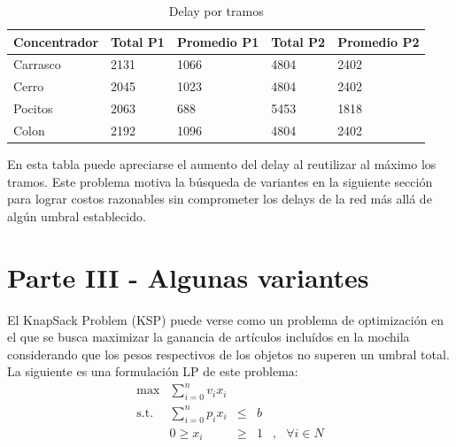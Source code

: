 \documentclass{extarticle}
\begin{document}
\begin{table}[h!]
	\centering
	\caption{Delay por tramos}
	\label{table:delay-tramos}
	\begin{tabular}{|l|l|l|l|l|} \hline
		Concentrador  &   Total P1    & Promedio P1 & Total P2    & Promedio P2   \\
		\hline
		Carrasco        &  2131 & 1066 & 4804 & 2402  \\  
		\hline
		Cerro     &  2045 & 1023 & 4804 & 2402  \\
		\hline
		Pocitos  &  2063 & 688 &  5453 & 1818 \\
		\hline
		Colon    &  2192 & 1096 &  4804 & 2402   \\
		\hline
	\end{tabular}
\end{table}
En esta tabla puede apreciarse el aumento del delay al reutilizar al máximo los tramos. Este problema motiva la búsqueda de variantes en la siguiente sección para lograr costos razonables sin comprometer los delays de la red más allá de algún umbral establecido.

\newpage
\section{Parte III - Algunas variantes}
El KnapSack Problem (KSP) puede verse como un problema de optimización en el que se busca maximizar la ganancia de artículos incluídos en la mochila considerando que los pesos respectivos de los objetos no superen un umbral total. La siguiente es una formulación LP de este problema:
\begin{equation}
\begin{array}{rrclcl}
\displaystyle \max & \sum_{i=0}^{n} v_ix_i  \\
\textrm{s.t.} & \sum_{i=0}^{n} p_ix_i & \leq & b \\
& 0 \geq x_i & \geq & 1  &, & \forall i \in N \\
\end{array}
\end{equation}
\end{document}
